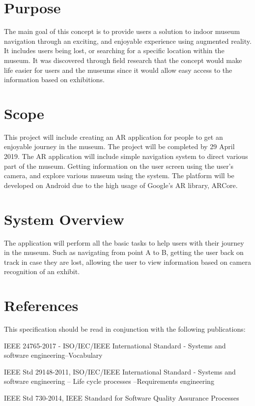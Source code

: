 \section*{Purpose}
The main goal of this concept is to provide users a solution to indoor museum navigation through an exciting, and enjoyable experience using augmented reality. It includes users being lost, or searching for a specific location within the museum. It was discovered through field research that the concept would make life easier for users and the museums since it would allow easy access to the information based on exhibitions.

\section*{Scope}
This project will include creating an AR application for people to get an enjoyable journey in the museum. The project will be completed by 29 April 2019. The AR application will include simple navigation system to direct various part of the museum. Getting information on the user screen using the user's camera, and explore various museum using the system. The platform will be developed on Android due to the high usage of Google's AR library, ARCore.

\section*{System Overview}
The application will perform all the basic tasks to help users with their journey in the museum. Such as navigating from point A to B, getting the user back on track in case they are lost, allowing the user to view information based on camera recognition of an exhibit.

\section*{References}
This specification should be read in conjunction with the following publications:

IEEE 24765-2017 - ISO/IEC/IEEE International Standard - Systems and software engineering--Vocabulary \cite{IEEE24765}

IEEE Std 29148-2011, ISO/IEC/IEEE International Standard - Systems and software engineering -- Life cycle processes --Requirements engineering \cite{IEEE29148} 

IEEE Std 730-2014, IEEE Standard for Software Quality Assurance Processes \cite{IEEE730} 

